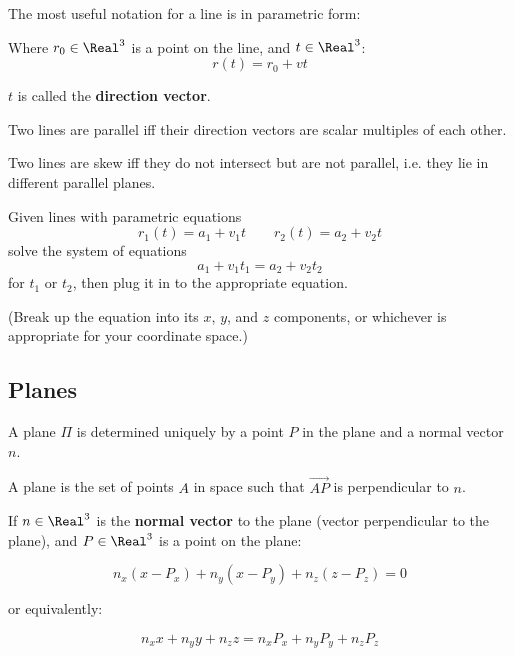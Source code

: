 The most useful notation for a line is in parametric form:

\begin{definition}
  Where $r_0 \in \Real^3$ is a point on the line, and $t \in \Real^3$:
  \[
    r(t) = r_0 + vt
  \]

  $t$ is called the \textbf{direction vector}.
\end{definition}

\begin{theorem}
  Two lines are parallel iff their direction vectors are scalar multiples of each other.
\end{theorem}

\begin{definition}
  Two lines are skew iff they do not intersect but are not parallel, i.e. they lie in different parallel planes.
\end{definition}

\begin{procedure}
  Given lines with parametric equations
  \[
    r_1(t) = a_1 + v_1 t \qquad r_2(t) = a_2 + v_2 t
  \]
  solve the system of equations
  \[
    a_1 + v_1 t_1 = a_2 + v_2 t_2
  \]
  for $t_1$ or $t_2$, then plug it in to the appropriate equation.

  (Break up the equation into its $x$, $y$, and $z$ components, or whichever is appropriate for your coordinate space.)
\end{procedure}

\subsection{Planes}


\begin{definition}[Plane]
  A plane $\Pi$ is determined uniquely by a point $P$ in the plane and a normal vector $n$.

  A plane is the set of points $A$ in space such that $\vec{AP}$ is perpendicular to $n$.
\end{definition}

\begin{theorem}
  If $n \in \Real^3$ is the \textbf{normal vector} to the plane (vector perpendicular to the plane), and $P \in \Real^3$ is a point on the plane:

  \[
    n_x (x - P_x) + n_y (x - P_y) + n_z (z - P_z) = 0
  \]

  or equivalently:

  \[
    n_x x + n_y y + n_z z = n_x P_x + n_y P_y + n_z P_z
  \]
\end{theorem}

